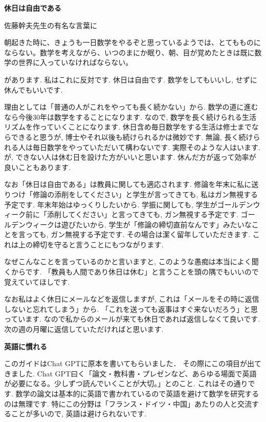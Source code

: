 \textbf{休日は自由である}  　\vspace{-6pt} 

佐藤幹夫先生の有名な言葉に
\begin{tcolorbox}[mybox]
朝起きた時に、きょうも一日数学をやるぞと思っているようでは、とてもものにならない。数学を考えながら、いつのまにか眠り、朝、目が覚めたときは既に数学の世界に入っていなければならない。
\end{tcolorbox}
 があります. 私はこれに反対です. 休日は自由です. 数学をしてもいいし, せずに休んでもいいです. 

理由としては「普通の人がこれをやっても長く続かない」から. 
数学の道に進むなら今後30年は数学をすることになります. なので, 数学を長く続けられる生活リズムを作っていくことになります. 
休日含め毎日数学をする生活は修士までならできると思うが, 博士やそれ以後も続けられるかは微妙です. 
無論, 長く続けられる人は毎日数学をやっていただいて構わないです. 実際そのような人はいます.
が, できない人は休む日を設けた方がいいと思います. 休んだ方が返って効率が良いこともあります. 

なお「休日は自由である」は教員に関しても適応されます. 修論を年末に私に送りつけ「修論の添削をしてください」と学生が言ってきても, 私はガン無視する予定です. 年末年始はゆっくりしたいから. 学振に関しても, 学生がゴールデンウィーク前に「添削してください」と言ってきても, ガン無視する予定です. ゴールデンウィークは遊びたいから. 学生が「修論の締切直前なんです」みたいなことを言っても, ガン無視する予定です. その場合は潔く留年していただきます. これは上の締切を守ると言うことにもつながります. 

なぜこんなことを言っているのかと言いますと, このような愚痴は本当によく聞くからです. 「教員も人間であり休日は休む」と言うことを頭の隅でもいいので覚えていてほしです.  

なお私はよく休日にメールなどを返信しますが, これは「メールをその時に返信しないと忘れてしまう」から.
「これを送っても返事はすぐ来ないだろう」と思っています. なので私からのメールが来ても休日であれば返信しなくて良いです. 次の週の月曜に返信していただければと思います. 
\vspace{8pt} 

\textbf{英語に慣れる}  　\vspace{-6pt} 

このガイドはChat GPTに原本を書いてもらいました．
その際にこの項目が出てきました. 
Chat GPT曰く「論文・教科書・プレゼンなど、あらゆる場面で英語が必要になる。少しずつ読んでいくことが大切。」とのこと. 
これはその通りです. 数学の論文は基本的に英語で書かれているので英語を避けて数学を研究するのは無理です. 特にこの分野は「フランス・ドイツ・中国」あたりの人と交流することが多いので, 英語は避けられないです. 

